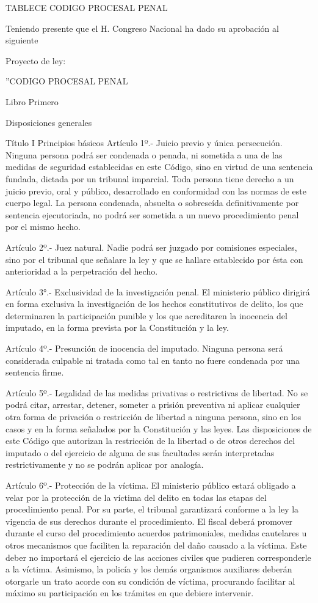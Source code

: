 TABLECE CODIGO PROCESAL PENAL

    Teniendo presente que el H. Congreso Nacional ha dado su aprobación al siguiente

    Proyecto de ley:

    ''CODIGO PROCESAL PENAL


    Libro Primero

    Disposiciones generales

    Título I
    Principios básicos
    Artículo 1º.- Juicio previo y única persecución. Ninguna persona podrá ser condenada o penada, ni sometida a una de las medidas de seguridad establecidas en este Código, sino en virtud de una sentencia fundada, dictada por un tribunal imparcial. Toda persona tiene derecho a un juicio previo, oral y público, desarrollado en conformidad con las normas de este cuerpo legal.
    La persona condenada, absuelta o sobreseída definitivamente por sentencia ejecutoriada, no podrá ser sometida a un nuevo procedimiento penal por el mismo hecho.

    Artículo 2º.- Juez natural. Nadie podrá ser juzgado por comisiones especiales, sino por el tribunal que señalare la ley y que se hallare establecido por ésta con anterioridad a la perpetración del hecho.

    Artículo 3°.- Exclusividad de la investigación penal. El ministerio público dirigirá en forma exclusiva la investigación de los hechos constitutivos de delito, los que determinaren la participación punible y los que acreditaren la inocencia del imputado, en la forma prevista por la Constitución y la ley.

    Artículo 4º.- Presunción de inocencia del imputado. Ninguna persona será considerada culpable ni tratada como tal en tanto no fuere condenada por una sentencia firme.

    Artículo 5º.- Legalidad de las medidas privativas o restrictivas de libertad. No se podrá citar, arrestar, detener, someter a prisión preventiva ni aplicar cualquier otra forma de privación o restricción de libertad a ninguna persona, sino en los casos y en la forma señalados por la Constitución y las leyes.
    Las disposiciones de este Código que autorizan la restricción de la libertad o de otros derechos del imputado o del ejercicio de alguna de sus facultades serán interpretadas restrictivamente y no se podrán aplicar por analogía.


    Artículo 6º.- Protección de la víctima. El ministerio público estará obligado a velar por la protección de la víctima del delito en todas las etapas del procedimiento penal. Por su parte, el tribunal garantizará conforme a la ley la vigencia de sus derechos durante el procedimiento.
    El fiscal deberá promover durante el curso del procedimiento acuerdos patrimoniales, medidas cautelares u otros mecanismos que faciliten la reparación del daño causado a la víctima. Este deber no importará el ejercicio de las acciones civiles que pudieren corresponderle a la víctima.
    Asimismo, la policía y los demás organismos auxiliares deberán otorgarle un trato acorde con su condición de víctima, procurando facilitar al máximo su participación en los trámites en que debiere intervenir.


